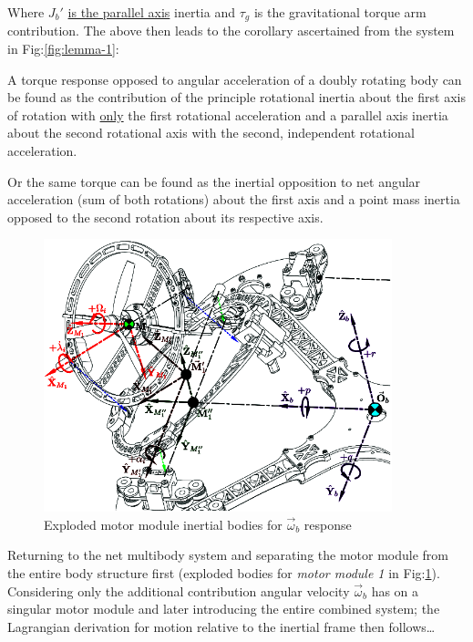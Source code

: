 Where $J_b'$ \underline{is the parallel axis} inertia and $\tau_g$ is the gravitational torque arm contribution. The above then leads to the corollary ascertained from the system in Fig:\ref{fig:lemma-1}:
\begin{lemma}\label{lem:1}
A torque response opposed to angular acceleration of a doubly rotating body can be found as the contribution of the principle rotational inertia about the first axis of rotation with \underline{only} the first rotational acceleration and a parallel axis inertia about the second rotational axis with the second, independent rotational acceleration.
\par
Or the same torque can be found as the inertial opposition to net angular acceleration (sum of both rotations) about the first axis and a point mass inertia opposed to the second rotation about its respective axis.
\end{lemma}
\par
\begin{figure}[htbp]
\centering
\includegraphics[width=0.9\textwidth]{figs/response-body}
\vspace{-5pt}
\caption{Exploded motor module inertial bodies for $\vec{\omega}_b$ response}
\label{fig:response-body}
\vspace{-12pt}
\end{figure}
Returning to the net multibody system and separating the motor module from the entire body structure first (exploded bodies for \emph{motor module 1} in Fig:\ref{fig:response-body}). Considering only the additional contribution angular velocity $\vec{\omega}_b$ has on a singular motor module and later introducing the entire combined system; the Lagrangian derivation for motion relative to the inertial frame then follows\ldots

